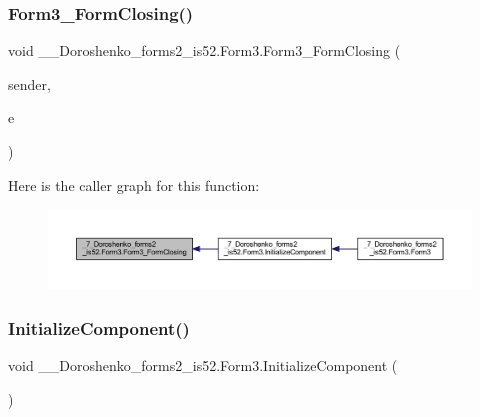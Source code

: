 \subsubsection{\texorpdfstring{Form3\+\_\+\+Form\+Closing()}{Form3\_FormClosing()}}
{\footnotesize\ttfamily void \+\_\+\_\+\+Doroshenko\+\_\+forms2\+\_\+is52.\+Form3.\+Form3\+\_\+\+Form\+Closing (\begin{DoxyParamCaption}\item[{object}]{sender,  }\item[{Form\+Closing\+Event\+Args}]{e }\end{DoxyParamCaption})\hspace{0.3cm}{\ttfamily [private]}}

Here is the caller graph for this function\+:
\nopagebreak
\begin{figure}[H]
\begin{center}
\leavevmode
\includegraphics[width=350pt]{class__7___doroshenko__forms2__is52_1_1_form3_abc403685bfbc9b5da1201d7ecd0ee1e5_icgraph}
\end{center}
\end{figure}
\hypertarget{class__7___doroshenko__forms2__is52_1_1_form3_ab0dbbaf316cc4293987708f101ead42d}{}\label{class__7___doroshenko__forms2__is52_1_1_form3_ab0dbbaf316cc4293987708f101ead42d} 
\subsubsection{\texorpdfstring{Initialize\+Component()}{InitializeComponent()}}
{\footnotesize\ttfamily void \+\_\+\_\+\+Doroshenko\+\_\+forms2\+\_\+is52.\+Form3.\+Initialize\+Component (\begin{DoxyParamCaption}{ }\end{DoxyParamCaption})\hspace{0.3cm}{\ttfamily [private]}}



